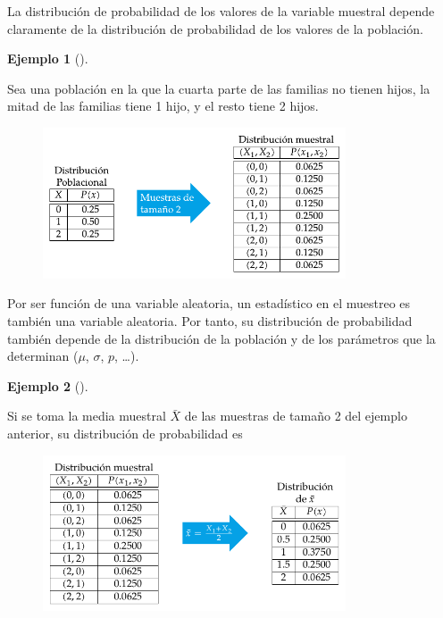 \documentclass[
  a4paper,
]{scrreport}
\theoremstyle{plain}
\theoremstyle{definition}
\newtheorem{example}{Ejemplo}[chapter]
\theoremstyle{definition}
\theoremstyle{remark}
\begin{document}
La distribución de probabilidad de los valores de la variable muestral
depende claramente de la distribución de probabilidad de los valores de
la población.

\begin{example}[]\protect\hypertarget{exm-distribucion-muestral}{}\label{exm-distribucion-muestral}

Sea una población en la que la cuarta parte de las familias no tienen
hijos, la mitad de las familias tiene 1 hijo, y el resto tiene 2 hijos.

\begin{figure}

{\centering \includegraphics[width=0.8\textwidth,height=\textheight]{img/estimacion/distribucion-variable-muestral.pdf}

}

\end{figure}

\end{example}

Por ser función de una variable aleatoria, un estadístico en el muestreo
es también una variable aleatoria. Por tanto, su distribución de
probabilidad también depende de la distribución de la población y de los
parámetros que la determinan (\(\mu\), \(\sigma\), \(p\), \ldots).

\begin{example}[]\protect\hypertarget{exm-distribucion-media-muestral}{}\label{exm-distribucion-media-muestral}

Si se toma la media muestral \(\bar X\) de las muestras de tamaño 2 del
ejemplo anterior, su distribución de probabilidad es

\begin{figure}

{\centering \includegraphics[width=0.8\textwidth,height=\textheight]{img/estimacion/distribucion-media.pdf}

}

\end{figure}

\end{example}
\end{document}
